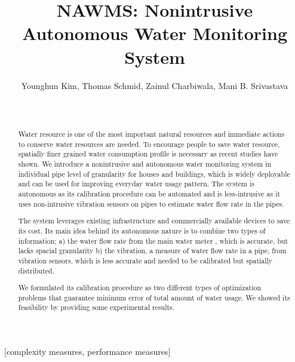 \documentclass[10pt]{sigplan-proc-varsize}
\author{
%
\alignauthor Younghun Kim, Thomas Schmid, Zainul Charbiwala, Mani B. Srivastava \\
        \affaddr{Networked and Embedded Systems Lab.}\\
        \affaddr{University of California, Los Angeles}\\
       \email{ {kimyh, thomas.schmid, zainul, mbs}@ucla.edu}
}
\title{NAWMS: Nonintrusive Autonomous Water Monitoring System}
\begin{document}
\maketitle


\begin{abstract}
Water resource is one of the most important natural resources and immediate actions to conserve water resources are needed. To encourage people to save water resource, spatially finer grained water consumption profile is necessary as recent studies have shown. We introduce a nonintrusive and autonomous water monitoring system in individual pipe level of granularity for houses and buildings, which is widely deployable and can be used for improving everyday water usage pattern. The system is autonomous as its calibration procedure can be automated and is less-intrusive as it uses non-intrusive vibration sensors on pipes to estimate water flow rate in the pipes.

The system leverages existing infrastructure and commercially available devices to save its cost. Its main idea behind its autonomous nature is to combine two types of information; a) the water flow rate from the main water meter , which is accurate, but lacks spacial granularity b) the vibration, a measure of water flow rate in a pipe, from vibration sensors, which is less accurate and needed to be calibrated but spatially distributed.

We formulated its calibration procedure as two different types of optimization problems that guarantee minimum error of total amount of water usage. We showed its feasibility by providing some experimental results.

\end{abstract}

[complexity measures, performance measures]















\end{document}
